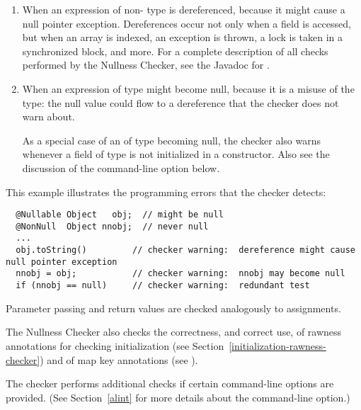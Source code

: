\begin{enumerate}

\item
  When an expression of non- type
  is dereferenced, because it might cause a null pointer exception.
  Dereferences occur not only when a field is accessed, but when an array
  is indexed, an exception is thrown, a lock is taken in a synchronized
  block, and more.  For a complete description of all checks performed by
  the Nullness Checker, see the Javadoc for
  .

\item
  When an expression of  type
  might become null, because it
  is a misuse of the type:  the null value could flow to a dereference that
  the checker does not warn about.

  As a special case of an of 
  type becoming null, the checker also warns whenever a field of
   type is not initialized in a
  constructor.  Also see the discussion of the 
  command-line option below.

\end{enumerate}

This example illustrates the programming errors that the checker detects:

\begin{Verbatim}
  @Nullable Object   obj;  // might be null
  @NonNull  Object nnobj;  // never null
  ...
  obj.toString()         // checker warning:  dereference might cause null pointer exception
  nnobj = obj;           // checker warning:  nnobj may become null
  if (nnobj == null)     // checker warning:  redundant test
\end{Verbatim}

Parameter passing and return values are checked analogously to assignments.

The Nullness Checker also checks the correctness, and correct use, of
rawness annotations for checking initialization (see
Section~\ref{initialization-rawness-checker}) and of map key annotations (see
).


The checker performs additional checks if certain 
command-line options are provided.  (See
Section~\ref{alint} for more details about the 
command-line option.)

